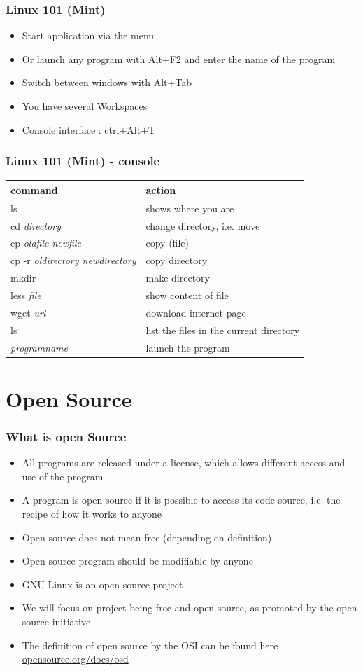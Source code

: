 \documentclass{beamer}
\begin{document}
\begin{frame}
\frametitle{Linux 101 (Mint)}
\begin{itemize}
\item Start application via the menu 
\item Or launch any program with Alt+F2 and enter the name of the program
\item Switch between windows with Alt+Tab
\item You have several Workspaces
\item Console interface : ctrl+Alt+T
\end{itemize}
\end{frame}

\begin{frame}
\frametitle{Linux 101 (Mint) - console}
\begin{tabular}{|l|l|}
\hline
command & action \\
\hline
ls & shows where you are \\
cd \textit{directory}& change directory, i.e. move\\
cp \textit{oldfile newfile} & copy (file) \\
cp -r \textit{oldirectory newdirectory}& copy directory\\
mkdir \textit{}& make directory\\
less \textit{file}& show content of file \\
wget \textit{url} & download internet page \\
ls & list the files in the current directory\\
\textit{programname} & launch the program\\
\hline
\end{tabular}
\end{frame}

\section{Open Source}

\begin{frame}
\frametitle{What is open Source}
\begin{itemize}
\item All programs are released under a license, which allows different access and use of the program
\item A program is open source if it is possible to access its code source, i.e. the recipe of how it works to anyone
\item Open source does not mean free (depending on definition)
\item Open source program should be modifiable by anyone 
\item GNU Linux is an open source project
\item We will focus on project being free and open source, as promoted by the open source initiative
\item The definition of open source by the OSI can be found here \url{opensource.org/docs/osd}
\end{itemize}
\end{frame}
\end{document}
